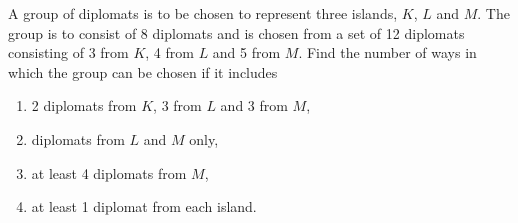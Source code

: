 \begin{problem}
    A group of diplomats is to be chosen to represent three islands, $K$, $L$ and $M$. The group is to consist of 8 diplomats and is chosen from a set of 12 diplomats consisting of 3 from $K$, 4 from $L$ and 5 from $M$. Find the number of ways in which the group can be chosen if it includes
    \begin{enumerate}
        \item 2 diplomats from $K$, 3 from $L$ and 3 from $M$,
        \item diplomats from $L$ and $M$ only,
        \item at least 4 diplomats from $M$,
        \item at least 1 diplomat from each island.
    \end{enumerate}
\end{problem}
